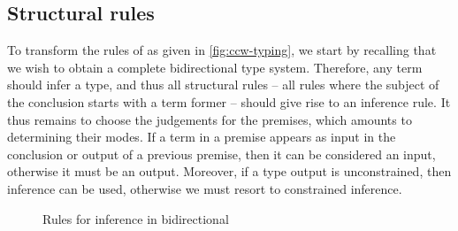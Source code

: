 \subsection{Structural rules}

To transform the rules of  as given in \cref{fig:ccw-typing}, we start by recalling that we wish to obtain a complete bidirectional type system.
Therefore, any term should infer a type, and thus all structural rules –
\ie all rules where the subject of the conclusion starts with a term former –
should give rise to an inference rule.
It thus remains to choose the judgements for the premises, which amounts to determining their modes.
If a term in a premise appears as input in the conclusion or output of a previous premise, then it can be considered an input, otherwise it must be an output. Moreover, if a type output is unconstrained, then inference can be used, otherwise we must resort to constrained inference.

\begin{figure}[ht]
  \ContinuedFloat*
  \caption{Rules for inference in bidirectional }
  \label{fig:ccw-bidir-infer}
\end{figure}

